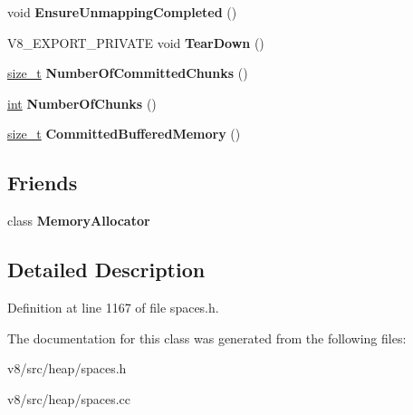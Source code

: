 \begin{DoxyCompactItemize}
void {\bfseries Ensure\+Unmapping\+Completed} ()
\item 
\mbox{\label{classv8_1_1internal_1_1MemoryAllocator_1_1Unmapper_a2fb82999fa80abf47d900b5a83af25a5}} 
V8\+\_\+\+E\+X\+P\+O\+R\+T\+\_\+\+P\+R\+I\+V\+A\+TE void {\bfseries Tear\+Down} ()
\item 
\mbox{\label{classv8_1_1internal_1_1MemoryAllocator_1_1Unmapper_ab3cc042c84b231c912e5bea5992448f9}} 
\mbox{\hyperlink{classsize__t}{size\+\_\+t}} {\bfseries Number\+Of\+Committed\+Chunks} ()
\item 
\mbox{\label{classv8_1_1internal_1_1MemoryAllocator_1_1Unmapper_a6212018e2c23089c5bdf63f68fddbe46}} 
\mbox{\hyperlink{classint}{int}} {\bfseries Number\+Of\+Chunks} ()
\item 
\mbox{\label{classv8_1_1internal_1_1MemoryAllocator_1_1Unmapper_a05423bbe22ca864f53b9d9929c65e809}} 
\mbox{\hyperlink{classsize__t}{size\+\_\+t}} {\bfseries Committed\+Buffered\+Memory} ()
\end{DoxyCompactItemize}
\subsection*{Friends}
\begin{DoxyCompactItemize}
\item 
\mbox{\label{classv8_1_1internal_1_1MemoryAllocator_1_1Unmapper_aea1126d5a764b0d074d2d6edb5a09f23}} 
class {\bfseries Memory\+Allocator}
\end{DoxyCompactItemize}


\subsection{Detailed Description}


Definition at line 1167 of file spaces.\+h.



The documentation for this class was generated from the following files\+:\begin{DoxyCompactItemize}
\item 
v8/src/heap/spaces.\+h\item 
v8/src/heap/spaces.\+cc\end{DoxyCompactItemize}
